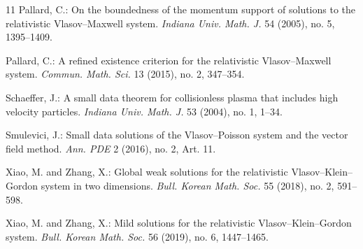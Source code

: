 \documentclass{article}
\begin{document}
\begin{thebibliography}{11}
 Pallard, C.:
On the boundedness of the momentum support of solutions to the relativistic Vlasov--Maxwell system.
{\it Indiana Univ. Math. J.} 54 (2005), no. 5, 1395--1409. 

 Pallard, C.:
A refined existence criterion for the relativistic Vlasov--Maxwell system.
{\it Commun. Math. Sci.} 13 (2015), no. 2, 347--354.

 Schaeffer, J.:
A small data theorem for collisionless plasma that includes high velocity particles.
{\it Indiana Univ. Math. J.} 53 (2004), no. 1, 1--34.

 Smulevici, J.:
Small data solutions of the Vlasov--Poisson system and the vector field method. 
{\it Ann. PDE} 2 (2016), no. 2, Art. 11.

 Xiao, M. and Zhang, X.:
Global weak solutions for the relativistic Vlasov--Klein--Gordon system in two dimensions.
{\it Bull. Korean Math. Soc.} 55 (2018), no. 2, 591--598. 

 Xiao, M. and Zhang, X.:
Mild solutions for the relativistic Vlasov--Klein--Gordon system.
{\it Bull. Korean Math. Soc.} 56 (2019), no. 6, 1447--1465.


\end{thebibliography}
\end{document}
